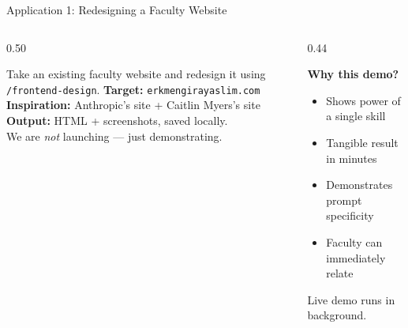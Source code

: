 \documentclass[aspectratio=169, 10pt]{beamer}
\begin{document}
\begin{frame}{Application 1: Redesigning a Faculty Website}
\begin{columns}[T]
\begin{column}{0.50\textwidth}
\begin{tcolorbox}[keybox, title={\faGlobe\quad The Task}]
\scriptsize
Take an existing faculty website and redesign it using \texttt{/frontend-design}.
\vskip3pt
\textbf{Target:} \texttt{erkmengirayaslim.com}\\
\textbf{Inspiration:} Anthropic's site + Caitlin Myers's site\\
\textbf{Output:} HTML + screenshots, saved locally.\\
We are \textit{not} launching --- just demonstrating.
\end{tcolorbox}
\end{column}
\begin{column}{0.44\textwidth}
\vskip2pt
\begin{tcolorbox}[accentbox]
\scriptsize
\textbf{Why this demo?}
\begin{itemize}\setlength{\itemsep}{0pt}\tiny
  \item Shows power of a single skill
  \item Tangible result in minutes
  \item Demonstrates prompt specificity
  \item Faculty can immediately relate
\end{itemize}
\end{tcolorbox}
\vskip3pt
{\scriptsize\color{CoolGray} \faPlay\; Live demo runs in background.}
\end{column}
\end{columns}
\end{frame}
\end{document}
